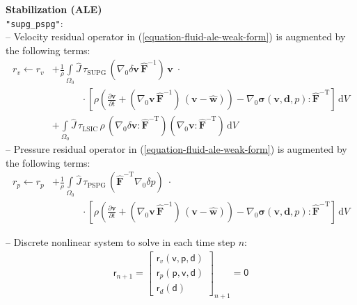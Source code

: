 \documentclass[a4paper,12pt]{report}
\newcommand{\bs}[1]{\boldsymbol{#1}}
\newcommand{\Om}{\mathit{\Omega}}
\newcommand{\ROP}{\bs{\mathsf{r}}}
\begin{document}
\textbf{Stabilization (ALE)}\\

\verb."supg_pspg".:\\
-- Velocity residual operator in (\ref{equation-fluid-ale-weak-form}) is augmented by the following terms:
\begin{equation}
\begin{aligned}
r_v \leftarrow r_v &+ \frac{1}{\rho}\int\limits_{\Om_0}\widehat{J}\, \tau_{\mathrm{SUPG}}\,(\nabla_0\delta\bs{v}\,\widehat{\bs{F}}^{-1})\,\bs{v}\;\cdot \\
& \qquad\quad \cdot\left[\rho\left(\frac{\partial \bs{v}}{\partial t} + (\nabla_0\bs{v}\,\widehat{\bs{F}}^{-1})\,(\bs{v}-\widehat{\bs{w}})\right) - \nabla_{0} \bs{\sigma}(\bs{v},\bs{d},p) : \widehat{\bs{F}}^{-\mathrm{T}}\right]\,\mathrm{d}V \\
& + \int\limits_{\Om_0}\widehat{J}\, \tau_{\mathrm{LSIC}}\,\rho\,(\nabla_{0}\delta\bs{v} : \widehat{\bs{F}}^{-\mathrm{T}})(\nabla_{0}\bs{v} : \widehat{\bs{F}}^{-\mathrm{T}})\,\mathrm{d}V
\end{aligned}
\end{equation}
-- Pressure residual operator in (\ref{equation-fluid-ale-weak-form}) is augmented by the following terms:
\begin{equation}
\begin{aligned}
r_p \leftarrow r_p &+ \frac{1}{\rho}\int\limits_{\Om_0}\widehat{J}\, \tau_{\mathrm{PSPG}}\,(\widehat{\bs{F}}^{-\mathrm{T}}\nabla_{0}\delta p) \;\cdot \\
& \qquad\quad \cdot \left[\rho\left(\frac{\partial \bs{v}}{\partial t} + (\nabla_0\bs{v}\,\widehat{\bs{F}}^{-1})\,(\bs{v}-\widehat{\bs{w}})\right) - \nabla_{0} \bs{\sigma}(\bs{v},\bs{d},p) : \widehat{\bs{F}}^{-\mathrm{T}}\right]\,\mathrm{d}V
\end{aligned}
\end{equation}

-- Discrete nonlinear system to solve in each time step $n$:
\begin{equation}
\label{equation-nonlin-sys-fluid-ale}
\begin{aligned}
\ROP_{n+1} = \begin{bmatrix} \ROP_{v}(\bs{\mathsf{v}},\bs{\mathsf{p}},\bs{\mathsf{d}}) \\ \ROP_{p}(\bs{\mathsf{p}},\bs{\mathsf{v}},\bs{\mathsf{d}}) \\ \ROP_{d}(\bs{\mathsf{d}}) \end{bmatrix}_{n+1} = \bs{\mathsf{0}}
\end{aligned}
\end{equation}
\end{document}
